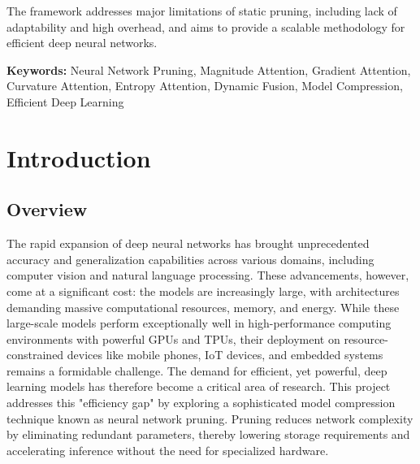 \documentclass[12pt,a4paper]{report}
\begin{document}
The framework addresses major limitations of static pruning, including lack of adaptability and high overhead, and aims to provide a scalable methodology for efficient deep neural networks.

\textbf{Keywords:} Neural Network Pruning, Magnitude Attention, Gradient Attention, Curvature Attention, Entropy Attention, Dynamic Fusion, Model Compression, Efficient Deep Learning

\clearpage %





\tableofcontents
\listoffigures
\vspace{6pt}

\clearpage %
\chapter{Introduction}
\section{Overview}
The rapid expansion of deep neural networks has brought unprecedented accuracy and generalization capabilities across various domains, including computer vision and natural language processing. These advancements, however, come at a significant cost: the models are increasingly large, with architectures demanding massive computational resources, memory, and energy. While these large-scale models perform exceptionally well in high-performance computing environments with powerful GPUs and TPUs, their deployment on resource-constrained devices like mobile phones, IoT devices, and embedded systems remains a formidable challenge. The demand for efficient, yet powerful, deep learning models has therefore become a critical area of research. This project addresses this "efficiency gap" by exploring a sophisticated model compression technique known as neural network pruning. Pruning reduces network complexity by eliminating redundant parameters, thereby lowering storage requirements and accelerating inference without the need for specialized hardware.

\clearpage

\end{document}
